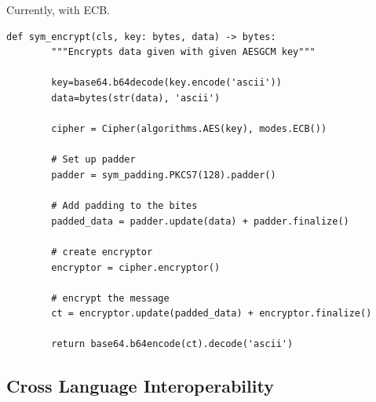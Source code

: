 \documentclass[11pt]{article}
\begin{document}
\begin{Large}
Currently, with ECB.
\end{Large}
\begin{lstlisting}[captionpos=b label=listing:sparql_getallindividuals,
   basicstyle=\ttfamily]
def sym_encrypt(cls, key: bytes, data) -> bytes:
        """Encrypts data given with given AESGCM key"""
 
        key=base64.b64decode(key.encode('ascii'))
        data=bytes(str(data), 'ascii')

        cipher = Cipher(algorithms.AES(key), modes.ECB()) 

        # Set up padder
        padder = sym_padding.PKCS7(128).padder()
        
        # Add padding to the bites
        padded_data = padder.update(data) + padder.finalize() 

        # create encryptor
        encryptor = cipher.encryptor()

        # encrypt the message
        ct = encryptor.update(padded_data) + encryptor.finalize()

        return base64.b64encode(ct).decode('ascii')

\end{lstlisting}


\subsection{Cross Language Interoperability}\label{cross language interoperability}
\end{document}
